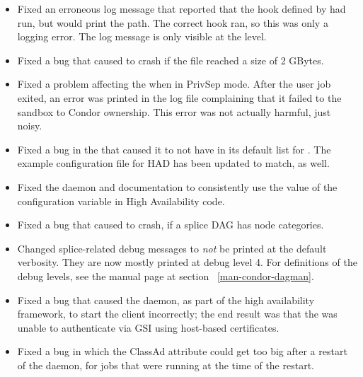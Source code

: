 \begin{itemize}
\item Fixed an erroneous log message that reported that
the hook defined by  had run,
but would print the  path.
The correct hook ran, so this was only a logging error.
The log message is only visible at the  level.

\item Fixed a bug that caused  to crash if the
 file reached a size of 2 GBytes.

\item Fixed a problem affecting the  when in PrivSep mode.
After the user job exited, an error was printed in the
 log file complaining that it failed to  the
sandbox to Condor ownership.  This error was not actually harmful,
just noisy.

\item Fixed a bug in the  that caused it to not have
   in its default list for .
  The example
  configuration file for HAD has been updated to match, as well.

\item Fixed the  daemon and documentation to consistently
  use the value of the configuration variable 
   in High Availability code.

\item Fixed a bug that caused  to crash,
if a splice DAG has node categories.

\item Changed splice-related  debug messages
to \emph{not} be printed at the default verbosity.
They are now mostly printed at debug level 4.
For definitions of the debug levels, see the  manual
page at section~ \ref{man-condor-dagman}.

\item Fixed a bug that caused the  daemon,
  as part of the high availability framework,
  to start the  client incorrectly; the end result was
  that the  was unable to authenticate via GSI
  using host-based certificates.

\item Fixed a bug in which the ClassAd attribute 
  could get too big after a restart of the  daemon,
  for jobs that were running at the time of the restart.


\end{itemize}
